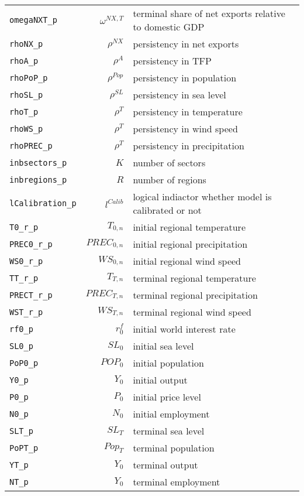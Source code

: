 \begin{center}
\begin{longtable}{lrl}
\texttt{omegaNXT\_p} & ${\omega^{NX,T}}$ & terminal share of net exports relative to domestic GDP\\
\texttt{rhoNX\_p} & ${\rho^{NX}}$ & persistency in net exports\\
\texttt{rhoA\_p} & ${\rho^{A}}$ & persistency in TFP\\
\texttt{rhoPoP\_p} & ${\rho^{Pop}}$ & persistency in population\\
\texttt{rhoSL\_p} & ${\rho^{SL}}$ & persistency in sea level\\
\texttt{rhoT\_p} & ${\rho^{T}}$ & persistency in temperature\\
\texttt{rhoWS\_p} & ${\rho^{T}}$ & persistency in wind speed\\
\texttt{rhoPREC\_p} & ${\rho^{T}}$ & persistency in precipitation\\
\texttt{inbsectors\_p} & ${K}$ & number of sectors\\
\texttt{inbregions\_p} & ${R}$ & number of regions\\
\texttt{lCalibration\_p} & ${l^{Calib}}$ & logical indiactor whether model is calibrated or not\\
\texttt{T0\_r\_p} & ${T_{0,n}}$ & initial regional temperature\\
\texttt{PREC0\_r\_p} & ${PREC_{0,n}}$ & initial regional precipitation\\
\texttt{WS0\_r\_p} & ${WS_{0,n}}$ & initial regional wind speed\\
\texttt{TT\_r\_p} & ${T_{T,n}}$ & terminal regional temperature\\
\texttt{PRECT\_r\_p} & ${PREC_{T,n}}$ & terminal regional precipitation\\
\texttt{WST\_r\_p} & ${WS_{T,n}}$ & terminal regional wind speed\\
\texttt{rf0\_p} & ${r^f_0}$ & initial world interest rate\\
\texttt{SL0\_p} & ${SL_0}$ & initial sea level\\
\texttt{PoP0\_p} & ${POP_0}$ & initial population\\
\texttt{Y0\_p} & ${Y_0}$ & initial output\\
\texttt{P0\_p} & ${P_0}$ & initial price level\\
\texttt{N0\_p} & ${N_0}$ & initial employment\\
\texttt{SLT\_p} & ${SL_T}$ & terminal sea level\\
\texttt{PoPT\_p} & ${Pop_T}$ & terminal population\\
\texttt{YT\_p} & ${Y_0}$ & terminal output\\
\texttt{NT\_p} & ${Y_0}$ & terminal employment\\
\hline%
\end{longtable}
\end{center}
